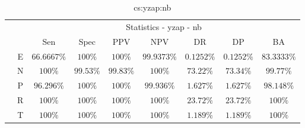 \begin{table}[!ht]
	\centering
	\begin{tabular}{|c|c|c|c|c|c|c|c|c|}
		\cline{3-9}
		\multicolumn{2}{c|}{} & \multicolumn{7}{c|}{Statistics - yzap - nb} \\ \cline{3-9}
		\multicolumn{2}{c|}{} & Sen & Spec & PPV & NPV & DR & DP & BA \\ \hline
		\multirow{5}{*}{\rotatebox{90}{Class}} & E & $66.6667\%$ & $100\%$ & $100\%$ & $99.9373\%$ & $0.1252\%$ & $0.1252\%$ & $83.3333\%$ \\ \cline{2-9}
		 & N & $100\%$ & $99.53\%$ & $99.83\%$ & $100\%$ & $73.22\%$ & $73.34\%$ & $99.77\%$ \\ \cline{2-9}
		 & P & $96.296\%$ & $100\%$ & $100\%$ & $99.936\%$ & $1.627\%$ & $1.627\%$ & $98.148\%$ \\ \cline{2-9}
		 & R & $100\%$ & $100\%$ & $100\%$ & $100\%$ & $23.72\%$ & $23.72\%$ & $100\%$ \\ \cline{2-9}
		 & T & $100\%$ & $100\%$ & $100\%$ & $100\%$ & $1.189\%$ & $1.189\%$ & $100\%$ \\ \hline
	\end{tabular}
	\caption{cs:yzap:nb}
	\label{tab:cs:yzap:nb}
\end{table}
